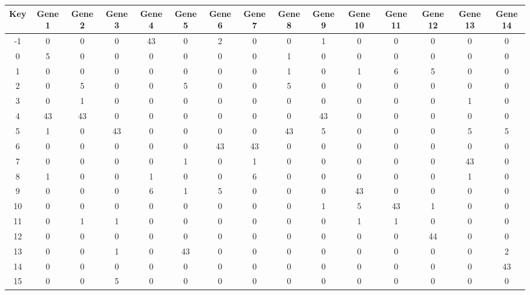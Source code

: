 \begin{tabular}{|c|c|c|c|c|c|c|c|c|c|c|c|c|c|c|}
\hline
Key & Gene 1 & Gene 2 & Gene 3 & Gene 4 & Gene 5 & Gene 6 & Gene 7 & Gene 8 & Gene 9 & Gene 10 & Gene 11 & Gene 12 & Gene 13 & Gene 14 \\
\hline
-1 & 0 & 0 & 0 & 43 & 0 & 2 & 0 & 0 & 1 & 0 & 0 & 0 & 0 & 0 \\
0 & 5 & 0 & 0 & 0 & 0 & 0 & 0 & 1 & 0 & 0 & 0 & 0 & 0 & 0 \\
1 & 0 & 0 & 0 & 0 & 0 & 0 & 0 & 1 & 0 & 1 & 6 & 5 & 0 & 0 \\
2 & 0 & 5 & 0 & 0 & 5 & 0 & 0 & 5 & 0 & 0 & 0 & 0 & 0 & 0 \\
3 & 0 & 1 & 0 & 0 & 0 & 0 & 0 & 0 & 0 & 0 & 0 & 0 & 1 & 0 \\
4 & 43 & 43 & 0 & 0 & 0 & 0 & 0 & 0 & 43 & 0 & 0 & 0 & 0 & 0 \\
5 & 1 & 0 & 43 & 0 & 0 & 0 & 0 & 43 & 5 & 0 & 0 & 0 & 5 & 5 \\
6 & 0 & 0 & 0 & 0 & 0 & 43 & 43 & 0 & 0 & 0 & 0 & 0 & 0 & 0 \\
7 & 0 & 0 & 0 & 0 & 1 & 0 & 1 & 0 & 0 & 0 & 0 & 0 & 43 & 0 \\
8 & 1 & 0 & 0 & 1 & 0 & 0 & 6 & 0 & 0 & 0 & 0 & 0 & 1 & 0 \\
9 & 0 & 0 & 0 & 6 & 1 & 5 & 0 & 0 & 0 & 43 & 0 & 0 & 0 & 0 \\
10 & 0 & 0 & 0 & 0 & 0 & 0 & 0 & 0 & 1 & 5 & 43 & 1 & 0 & 0 \\
11 & 0 & 1 & 1 & 0 & 0 & 0 & 0 & 0 & 0 & 1 & 1 & 0 & 0 & 0 \\
12 & 0 & 0 & 0 & 0 & 0 & 0 & 0 & 0 & 0 & 0 & 0 & 44 & 0 & 0 \\
13 & 0 & 0 & 1 & 0 & 43 & 0 & 0 & 0 & 0 & 0 & 0 & 0 & 0 & 2 \\
14 & 0 & 0 & 0 & 0 & 0 & 0 & 0 & 0 & 0 & 0 & 0 & 0 & 0 & 43 \\
15 & 0 & 0 & 5 & 0 & 0 & 0 & 0 & 0 & 0 & 0 & 0 & 0 & 0 & 0 \\
\hline
\end{tabular}